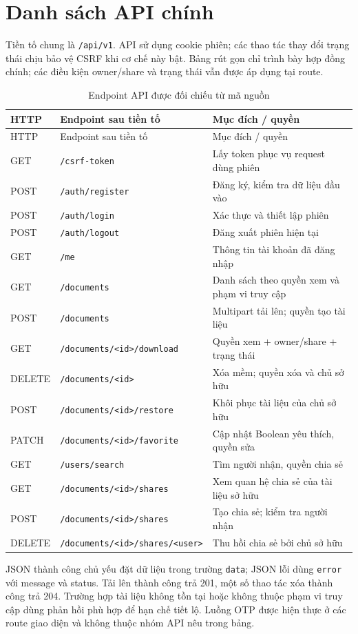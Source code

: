 \chapter{Danh sách API chính}
Tiền tố chung là \nolinkurl{/api/v1}. API sử dụng cookie phiên; các thao tác thay đổi trạng thái chịu bảo vệ CSRF khi cơ chế này bật. Bảng rút gọn chỉ trình bày hợp đồng chính; các điều kiện owner/share và trạng thái vẫn được áp dụng tại route.
{\small\begin{longtable}{P{1.8cm}P{5.7cm}P{5.2cm}}
\caption{Endpoint API được đối chiếu từ mã nguồn}\\\toprule
\textbf{HTTP}&\textbf{Endpoint sau tiền tố}&\textbf{Mục đích / quyền}\\\midrule\endfirsthead
\toprule HTTP&Endpoint sau tiền tố&Mục đích / quyền\\\midrule\endhead
GET & \nolinkurl{/csrf-token} & Lấy token phục vụ request dùng phiên\\
POST & \nolinkurl{/auth/register} & Đăng ký, kiểm tra dữ liệu đầu vào\\
POST & \nolinkurl{/auth/login} & Xác thực và thiết lập phiên\\
POST & \nolinkurl{/auth/logout} & Đăng xuất phiên hiện tại\\
GET & \nolinkurl{/me} & Thông tin tài khoản đã đăng nhập\\
GET & \nolinkurl{/documents} & Danh sách theo quyền xem và phạm vi truy cập\\
POST & \nolinkurl{/documents} & Multipart tải lên; quyền tạo tài liệu\\
GET & \nolinkurl{/documents/<id>/download} & Quyền xem + owner/share + trạng thái\\
DELETE & \nolinkurl{/documents/<id>} & Xóa mềm; quyền xóa và chủ sở hữu\\
POST & \texttt{/documents/<id>/}\newline\texttt{restore} & Khôi phục tài liệu của chủ sở hữu\\
PATCH & \nolinkurl{/documents/<id>/favorite} & Cập nhật Boolean yêu thích, quyền sửa\\
GET & \nolinkurl{/users/search} & Tìm người nhận, quyền chia sẻ\\
GET & \nolinkurl{/documents/<id>/shares} & Xem quan hệ chia sẻ của tài liệu sở hữu\\
POST & \nolinkurl{/documents/<id>/shares} & Tạo chia sẻ; kiểm tra người nhận\\
DELETE & \texttt{/documents/<id>/}\newline\texttt{shares/<user>} & Thu hồi chia sẻ bởi chủ sở hữu\\\bottomrule
\end{longtable}}
JSON thành công chủ yếu đặt dữ liệu trong trường \texttt{data}; JSON lỗi dùng \texttt{error} với message và status. Tải lên thành công trả 201, một số thao tác xóa thành công trả 204. Trường hợp tài liệu không tồn tại hoặc không thuộc phạm vi truy cập dùng phản hồi phù hợp để hạn chế tiết lộ. Luồng OTP được hiện thực ở các route giao diện và không thuộc nhóm API nêu trong bảng.
\fi

